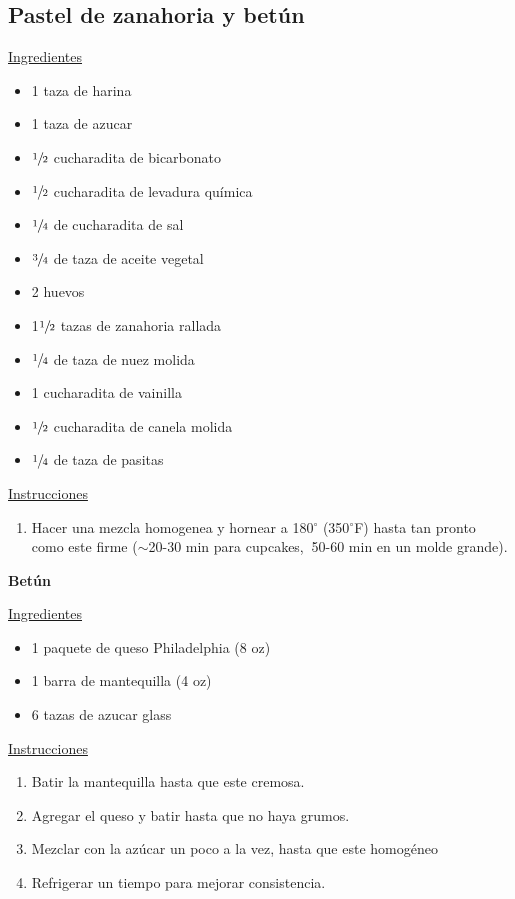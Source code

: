 \subsection{Pastel de zanahoria y bet\'un}

\underline{Ingredientes}
\begin{itemize}
\item 1 taza de harina
\item 1 taza de azucar
\item $\sfrac{1}{2}$ cucharadita de bicarbonato
\item $\sfrac{1}{2}$ cucharadita de levadura qu\'imica
\item $\sfrac{1}{4}$ de cucharadita de sal
\item $\sfrac{3}{4}$ de taza de aceite vegetal
\item 2 huevos
\item 1$\sfrac{1}{2}$ tazas de zanahoria rallada
\item $\sfrac{1}{4}$ de taza de nuez molida
\item 1 cucharadita de vainilla
\item $\sfrac{1}{2}$ cucharadita de canela molida
\item $\sfrac{1}{4}$ de taza de pasitas
\end{itemize}

\underline{Instrucciones}
\begin{enumerate}
\item Hacer una mezcla homogenea y hornear a 180$^\circ$ (350$^\circ$F) hasta tan pronto como este firme ($\sim$20-30 min para cupcakes, $~$50-60 min en un molde grande).\\
\end{enumerate}

\textbf{Betún}

\underline{Ingredientes}
\begin{itemize}
\item 1 paquete de queso Philadelphia (8 oz)
\item 1 barra de mantequilla (4 oz)
\item 6 tazas de azucar glass
\end{itemize}

\underline{Instrucciones}
\begin{enumerate}
\item Batir la mantequilla hasta que este cremosa.
\item Agregar el queso y batir hasta que no haya grumos.
\item Mezclar con la az\'ucar un poco a la vez, hasta que este homog\'eneo
\item Refrigerar un tiempo para mejorar consistencia.
\end{enumerate}

